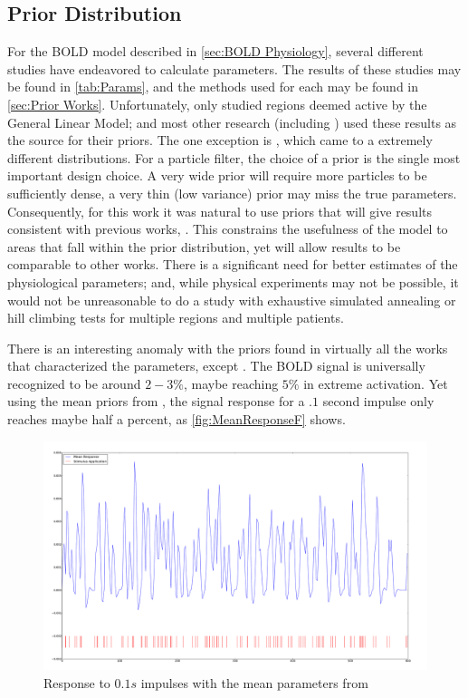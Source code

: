 \subsection{Prior Distribution}
\label{sec:PriorDist}
For the BOLD model described in \autoref{sec:BOLD Physiology}, several
different studies have endeavored to calculate parameters. The results
of these studies may be found in \autoref{tab:Params}, and the methods 
used for each may be found in \autoref{sec:Prior Works}. Unfortunately,
\cite{Friston2000} only studied regions deemed active by the General 
Linear Model; and most other research (including \cite{Friston2001}) used these results as 
the source for their priors. 
The one exception is \cite{Johnston2008}, which came to a extremely different
distributions. For a particle filter, the choice of a prior is
the single most important design choice. A very wide prior will require
more particles to be sufficiently dense, a very thin (low variance) prior may miss
the true parameters. Consequently, for this work it was natural
to use priors that will give results consistent with previous works, 
\cite{Friston2000}. This constrains the usefulness of the model to
areas that fall within the prior distribution, yet will allow results
to be comparable to other works. There is a significant need for better
estimates of the physiological parameters; and, while physical experiments
may not be possible, it would not be unreasonable to do a study with
exhaustive simulated annealing or hill climbing tests for multiple
regions and multiple patients.

There is an interesting anomaly with the priors found in virtually all
the works that characterized the parameters, except \cite{Johnston2008}.
The BOLD signal is universally recognized to be around $2-3\%$, maybe
reaching $5\%$ in extreme activation. Yet using the mean priors
from \cite{Friston2000}, the signal response for a $.1$ second
impulse only reaches maybe half a percent, as \autoref{fig:MeanResponseF}
shows.

\begin{figure}
\centering
\label{fig:MeanResponseF}
\includegraphics[trim=6cm 3cm 6cm 3cm,width=16cm]{images/mean_response}
\caption{Response to $0.1s$ impulses with the mean parameters from \cite{Friston2000}}
\end{figure}

